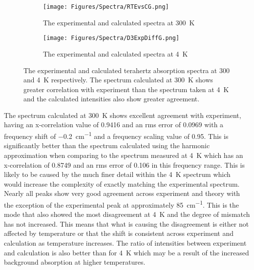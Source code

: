 \begin{figure}
\centering

\begin{subfigure}{0.49\textwidth}
\centering
\texttt{[image: Figures/Spectra/RTEvsCG.png]}
\caption{The experimental and calculated spectra at \SI{300}{K}}
\label{fig:RTvsEXP300K}
\end{subfigure}
\begin{subfigure}{0.49\textwidth}
\centering
\texttt{[image: Figures/Spectra/D3ExpDiffG.png]}
\caption{The experimental and calculated spectra at \SI{4}{K}}
\label{fig:RTvsEXP4K}
\end{subfigure}

\captionsetup{font = footnotesize, justification = centering}
\caption[The Calculated Terahertz Absorption Spectra at 300 and \SI{4}{K}]{The experimental and calculated terahertz absorption spectra at 300 and \SI{4}{K} respectively. The spectrum calculated at \SI{300}{K} shows greater correlation with experiment than the spectrum taken at \SI{4}{K} and the calculated intensities also show greater agreement.}
\label{Fig:RTvsEXP}
\end{figure}

The spectrum calculated at \SI{300}{K} shows excellent agreement with experiment, having an x-correlation value of 0.9416 and an \acrshort{rms} error of 0.0969 with a frequency shift of \SI{-0.2}{cm^{-1}} and a frequency scaling value of 0.95. This is significantly better than the spectrum calculated using the harmonic approximation when comparing to the spectrum measured at \SI{4}{K} which has an x\nobreakdash-correlation of 0.8749 and an \acrshort{rms} error of 0.106 in this frequency range. This is likely to be caused by the much finer detail within the \SI{4}{K} spectrum which would increase the complexity of exactly matching the experimental spectrum. Nearly all peaks show very good agreement across experiment and theory with the exception of the experimental peak at approximately \SI{85}{cm^{-1}}. This is the mode that also showed the most disagreement at \SI{4}{K} and the degree of mismatch has not increased. This means that what is causing the disagreement is either not affected by temperature or that the shift is consistent across experiment and calculation as temperature increases. The ratio of intensities between experiment and calculation is also better than for \SI{4}{K} which may be a result of the increased background absorption at higher temperatures.

